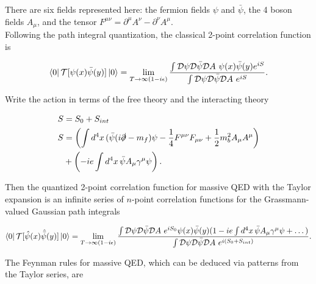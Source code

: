 \noindent There are six fields represented here: the fermion fields $\psi$ and $\bar{\psi}$, the 4 boson fields $A_\mu$, and the tensor $F^{\mu\nu} = \partial^\mu A^\nu - \partial^\nu A^\mu$. \\

\noindent Following the path integral quantization, the classical 2-point correlation function is

\begin{equation}
\bra{0} \mathcal{T} [ \psi (x) \bar{\psi} (y) ] \ket{0} = \lim_{T \rightarrow \infty (1-i \epsilon)} \frac{\int \mathcal{D} \psi \mathcal{D} \bar{\psi} \mathcal{D} A \,\, \psi (x) \bar{\psi} (y) e^{iS}}{\int \mathcal{D} \psi \mathcal{D} \bar{\psi} \mathcal{D} A \,\, e^{iS}}.
\end{equation}

\noindent Write the action in terms of the free theory and the interacting theory

\begin{align*}
S &= S_0 + S_{int} \\
S &= \left( \int d^4 x \, (\bar{\psi} ( i \slashed{\partial} - m_f ) \psi - \frac{1}{4} F^{\mu\nu} F_{\mu\nu} + \frac{1}{2} m_b^2 A_\mu A^\mu \right) \\ 
&+ \left( -ie \int d^4 x \, \bar{\psi} A_\mu \gamma^\mu \psi  \right).
\end{align*}

\noindent Then the quantized 2-point correlation function for massive QED with the Taylor expansion is an infinite series of $n$-point correlation functions for the Grassmann-valued Gaussian path integrals

\begin{equation}
\bra{0} \mathcal{T} [ \hat{\psi} (x) \hat{\bar{\psi}} (y) ] \ket{0} = \lim_{T \rightarrow \infty (1-i \epsilon)} \frac{\int \mathcal{D} \psi \mathcal{D} \bar{\psi} \mathcal{D} A \,\, e^{i S_0} \psi (x) \bar{\psi} (y) ( 1 - i e \int d^4 x \, \bar{\psi} A_\mu \gamma^\mu \psi + \dots ) }{\int \mathcal{D} \psi \mathcal{D} \bar{\psi} \mathcal{D} A \,\, e^{i(S_0 + S_{int})}}.
\end{equation}

\noindent The Feynman rules for massive QED, which can be deduced via patterns from the Taylor series, are

